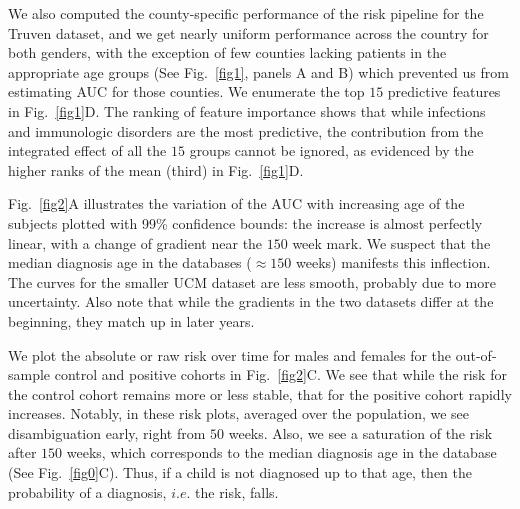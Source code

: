 \documentclass[onecolumn,,10pt]{IEEEtran}
\def\treatment{positive\xspace}
\begin{document}
We also computed the county-specific performance of the risk pipeline for the Truven dataset, and we get nearly uniform performance across the country for both genders, with the exception of  few counties lacking patients in the appropriate age groups (See Fig.~\ref{fig1}, panels A and B) which prevented us from estimating AUC for those counties. 
We enumerate the top $15$ predictive features in Fig.~\ref{fig1}D. The ranking of feature importance shows  that while infections and immunologic disorders are the most predictive, the contribution from the integrated effect of all the $15$ groups cannot be ignored, as evidenced by the higher ranks of the mean  (third) in Fig.~\ref{fig1}D. 


Fig.~\ref{fig2}A illustrates the variation of the  AUC  with increasing age of the subjects plotted with 99\% confidence bounds: the increase is almost perfectly linear, with a change of gradient near the $150$ week mark. We suspect that the median diagnosis age in the databases ($\approx 150$ weeks) manifests this inflection. The curves for the smaller UCM dataset are less smooth, probably due to more uncertainty. Also note that while the gradients in the two datasets differ at the beginning, they match up in later years.


We plot the absolute or raw risk over time for males and females for the out-of-sample control and \treatment cohorts in Fig.~\ref{fig2}C. We see that while the risk for the control cohort remains more or less stable,   that for the \treatment cohort rapidly increases. Notably, in these risk plots, averaged over the population,   we see disambiguation  early, right from $50$ weeks. Also, we see a saturation of the risk after $150$ weeks, which corresponds to the median diagnosis age in the database (See Fig.~\ref{fig0}C). Thus, if a child is not diagnosed up to that age, then the probability of a diagnosis, $i.e.$ the risk,  falls. 
\end{document}

